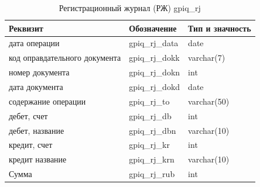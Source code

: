 


\begin{table}[h!p]
    \centering
    \scriptsize
    \caption{Регистрационный журнал (РЖ) gpiq\_rj}
    \begin{tabular}{|l|l|l|} 

                                                                                       \hline
\textbf{Реквизит}               &\textbf{Обозначение}   &\textbf{Тип и значность}   \\ \hline
дата операции                   &gpiq\_rj\_data         &date                       \\ \hline
код оправдательного документа   &gpiq\_rj\_dokk         &varchar(7)                 \\ \hline
номер документа                 &gpiq\_rj\_dokn         &int                        \\ \hline
дата документа                  &gpiq\_rj\_dokd         &date                       \\ \hline
содержание операции             &gpiq\_rj\_to           &varchar(50)                \\ \hline
дебет, счет                     &gpiq\_rj\_db           &int                        \\ \hline
дебет, название                 &gpiq\_rj\_dbn          &varchar(10)                \\ \hline
кредит, счет                    &gpiq\_rj\_kr           &int                        \\ \hline
кредит название                 &gpiq\_rj\_krn          &varchar(10)                \\ \hline
Сумма                           &gpiq\_rj\_rub          &int                        \\ \hline

    \end{tabular}
\end{table}

